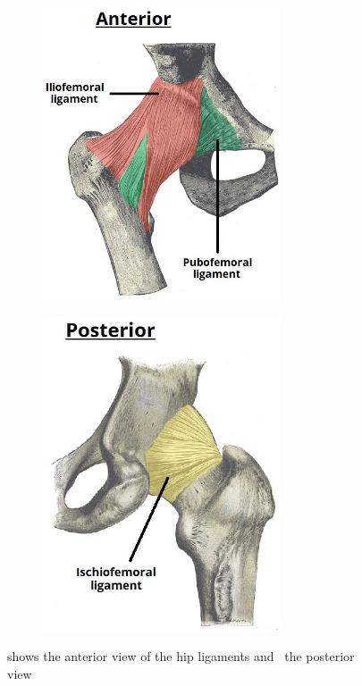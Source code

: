 \documentclass[whitelogo]{tudelft-report}
\begin{document}
{\begin{figure}[!htb]
	\centering
	\begin{subfigure}[b]{0.5\linewidth}
	    \centering\includegraphics[width=200pt]{hip_ligaments_anterior.jpg}
	    \caption{\label{fig:fig1}}
	\end{subfigure}%
	\begin{subfigure}[b]{0.5\linewidth}
	    \centering\includegraphics[width=200pt]{hip_ligaments_posterior.jpg}
	    \caption{\label{fig:fig2}}
	\end{subfigure}
	\caption{ shows the anterior view of the hip ligaments and~ the posterior view~\cite{Hipligaments2018}}
\end{figure}
}
\end{document}
